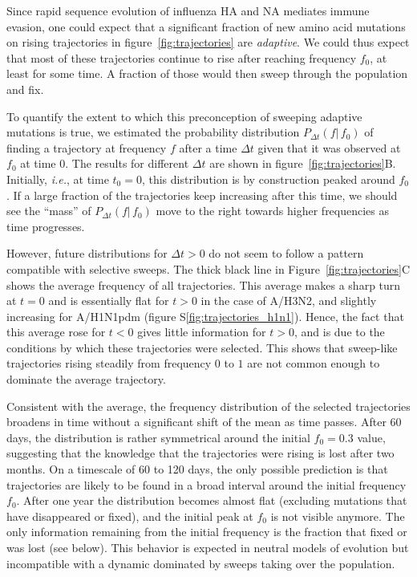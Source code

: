 \documentclass[reprint,amsmath,amssymb,superscriptaddress,showpacs,rmp]{revtex4-1}
\newcommand{\sref}[1]{S\ref{#1}}
\begin{document}
Since rapid sequence evolution of influenza HA and NA mediates immune evasion, one could expect that a significant fraction of new amino acid mutations on rising trajectories in figure~\ref{fig:trajectories} are \emph{adaptive}.
We could thus expect that most of these trajectories continue to rise after reaching frequency $f_0$, at least for some time.
A fraction of those would then sweep through the population and fix.

To quantify the extent to which this preconception of sweeping adaptive mutations is true, we estimated the probability distribution $P_{\Delta t}(f\vert\,f_0)$ of finding a trajectory at frequency $f$ after a time $\Delta t$ given that it was observed at $f_0$ at time $0$.
The results for different $\Delta t$ are shown in figure~\ref{fig:trajectories}B.
Initially, \emph{i.e.}, at time $t_0=0$, this distribution is by construction peaked around $f_0$.
If a large fraction of the trajectories keep increasing after  this time, we should see the ``mass'' of $P_{\Delta t}(f\vert\,f_0)$ move to the right towards higher frequencies as time progresses.

However, future distributions for $\Delta t >0$ do not seem to follow a pattern compatible with selective sweeps.
The thick black line in Figure~\ref{fig:trajectories}C shows the average frequency of all trajectories.
This average makes a sharp turn at $t=0$ and is essentially flat for $t>0$ in the case of A/H3N2, and slightly increasing for A/H1N1pdm (figure \sref{fig:trajectories_h1n1}).
Hence, the fact that this average rose for $t<0$ gives little information for $t>0$, and is due to the conditions by which these trajectories were selected.
This shows that sweep-like trajectories rising steadily from frequency $0$ to $1$ are not common enough to dominate the average trajectory.

Consistent with the average, the frequency distribution of the selected trajectories broadens in time without a significant shift of the mean as time passes.
After 60 days, the distribution is rather symmetrical around the initial $f_0=0.3$ value, suggesting that the knowledge that the trajectories were rising is lost after two months.
On a timescale of 60 to 120 days, the only possible prediction is that trajectories are likely to be found in a broad interval around the initial frequency $f_0$.
After one year the distribution becomes almost flat (excluding mutations that have disappeared or fixed), and the initial peak at $f_0$ is not visible anymore.
The only information remaining from the initial frequency is the fraction that fixed or was lost (see below).
This behavior is expected in neutral models of evolution \citep{kimura_diffusion_1964} but incompatible with a dynamic dominated by sweeps taking over the population.
\end{document}
